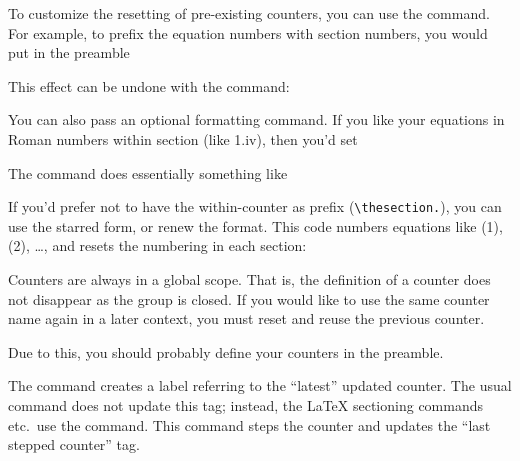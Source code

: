 To customize the resetting of pre-existing counters,
you can use the  command.
For example, to prefix the equation numbers with section numbers,
you would put in the preamble
%
\begin{ExampleCode}
\end{ExampleCode}
%
This effect can be undone with the  command:
%
\begin{ExampleCode}
\end{ExampleCode}
%
You can also pass an optional formatting command.
If you like your equations in Roman numbers within section (like 1.iv), then you'd set
%
\begin{ExampleCode}
\end{ExampleCode}
%
The  command does essentially something like
\begin{ExampleCode}
\renewcommand{\theequation}{\thesection.\Roman{equation}}
\end{ExampleCode}
If you'd prefer not to have the within-counter as prefix (\verb|\thesection.|),
you can use the starred  form, or renew the format.
This code numbers equations like (1), (2), \dots, and resets the numbering in each section:
%
\begin{ExampleCode}
\renewcommand\theequation{\arabic{equation}}
\end{ExampleCode}

\begin{technote}
Counters are always in a global scope.
That is, the definition of a counter does not disappear as the group is closed.
If you would like to use the same counter name again in a later context,
you must reset and reuse the previous counter.

Due to this, you should probably define your counters in the preamble.
\end{technote}

\begin{technote}\label{rem:refstepcounter}
The  command creates a label referring to the ``latest'' updated counter.
The usual  command does not update this tag;
instead, the \LaTeX{} sectioning commands etc.\ use the  command.
This command steps the counter and updates the ``last stepped counter'' tag.
\end{technote}


